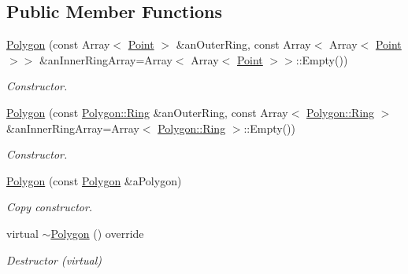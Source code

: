 \subsection*{Public Member Functions}
\begin{DoxyCompactItemize}
\item 
\hyperlink{classlibrary_1_1math_1_1geom_1_1d2_1_1objects_1_1_polygon_ad2a0b0bcd5301dbcd9e2fa101fbd220b}{Polygon} (const Array$<$ \hyperlink{classlibrary_1_1math_1_1geom_1_1d2_1_1objects_1_1_point}{Point} $>$ \&an\+Outer\+Ring, const Array$<$ Array$<$ \hyperlink{classlibrary_1_1math_1_1geom_1_1d2_1_1objects_1_1_point}{Point} $>$$>$ \&an\+Inner\+Ring\+Array=Array$<$ Array$<$ \hyperlink{classlibrary_1_1math_1_1geom_1_1d2_1_1objects_1_1_point}{Point} $>$$>$\+::Empty())
\begin{DoxyCompactList}\small\item\em Constructor. \end{DoxyCompactList}\item 
\hyperlink{classlibrary_1_1math_1_1geom_1_1d2_1_1objects_1_1_polygon_aa4027d2fb87cf861743dddade057f73d}{Polygon} (const \hyperlink{classlibrary_1_1math_1_1geom_1_1d2_1_1objects_1_1_polygon_aa543e7078b73e1d307ca8317d765cd9c}{Polygon\+::\+Ring} \&an\+Outer\+Ring, const Array$<$ \hyperlink{classlibrary_1_1math_1_1geom_1_1d2_1_1objects_1_1_polygon_aa543e7078b73e1d307ca8317d765cd9c}{Polygon\+::\+Ring} $>$ \&an\+Inner\+Ring\+Array=Array$<$ \hyperlink{classlibrary_1_1math_1_1geom_1_1d2_1_1objects_1_1_polygon_aa543e7078b73e1d307ca8317d765cd9c}{Polygon\+::\+Ring} $>$\+::Empty())
\begin{DoxyCompactList}\small\item\em Constructor. \end{DoxyCompactList}\item 
\hyperlink{classlibrary_1_1math_1_1geom_1_1d2_1_1objects_1_1_polygon_a6384fadfb81c792d137693e8f0dd14f9}{Polygon} (const \hyperlink{classlibrary_1_1math_1_1geom_1_1d2_1_1objects_1_1_polygon}{Polygon} \&a\+Polygon)
\begin{DoxyCompactList}\small\item\em Copy constructor. \end{DoxyCompactList}\item 
virtual \hyperlink{classlibrary_1_1math_1_1geom_1_1d2_1_1objects_1_1_polygon_ab384278ae8b6089c45a79856f71370ca}{$\sim$\+Polygon} () override
\begin{DoxyCompactList}\small\item\em Destructor (virtual) \end{DoxyCompactList}\item 

\end{DoxyCompactItemize}
